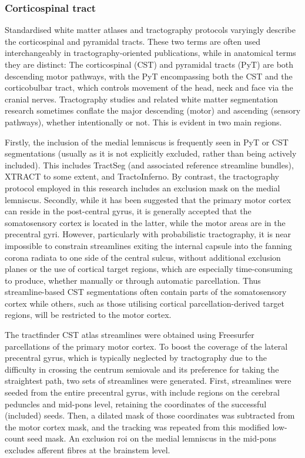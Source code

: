 \subsubsection*{Corticospinal tract}

Standardised white matter atlases and tractography protocols varyingly describe the corticospinal and pyramidal tracts.
These two terms are often used interchangeably in tractography-oriented publications, while in anatomical terms they are distinct:
The corticospinal (CST) and pyramidal tracts (PyT) are both descending motor pathways, with the PyT encompassing both the CST and the corticobulbar tract, which controls movement of the head, neck and face via the cranial nerves.
Tractography studies and related white matter segmentation research sometimes conflate the major descending (motor) and ascending (sensory pathways), whether intentionally or not. 
This is evident in two main regions.

Firstly, the inclusion of the medial lemniscus is frequently seen in PyT or CST segmentations (usually as it is not explicitly excluded, rather than being actively included).
This includes TractSeg (and associated reference streamline bundles), XTRACT to some extent, and TractoInferno.
By contrast, the tractography protocol employed in this research includes an exclusion mask on the medial lemniscus.
Secondly, while it has been suggested that the primary motor cortex can reside in the post-central gyrus,\autocite{Kumar2009} it is generally accepted that the somatosensory cortex is located in the latter, while the motor areas are in the precentral gyri.
However, particularly with probabilistic tractography, it is near impossible to constrain streamlines exiting the internal capsule into the fanning corona radiata to one side of the central sulcus, without additional exclusion planes or the use of cortical target regions, which are especially time-consuming to produce, whether manually or through automatic parcellation.
Thus streamline-based CST segmentations often contain parts of the somatosensory cortex\autocite{Poulin2021} while others, such as those utilising cortical parcellation-derived target regions, will be restricted to the motor cortex.

The tractfinder CST atlas streamlines were obtained using Freesurfer parcellations \autocite{Desikan2006,FischlSalat2002} of the primary motor cortex.
To boost the coverage of the lateral precentral gyrus, which is typically neglected by tractography due to the difficulty in crossing the centrum semiovale and its preference for taking the straightest path, two sets of streamlines were generated.
First, streamlines were seeded from the entire precentral gyrus, with include regions on the cerebral peduncles and mid-pons level, retaining the coordinates of the successful (included) seeds.
Then, a dilated mask of those coordinates was subtracted from the motor cortex mask, and the tracking was repeated from this modified low-count seed mask.
An exclusion \gls{roi} on the medial lemniscus in the mid-pons excludes afferent fibres at the brainstem level.

